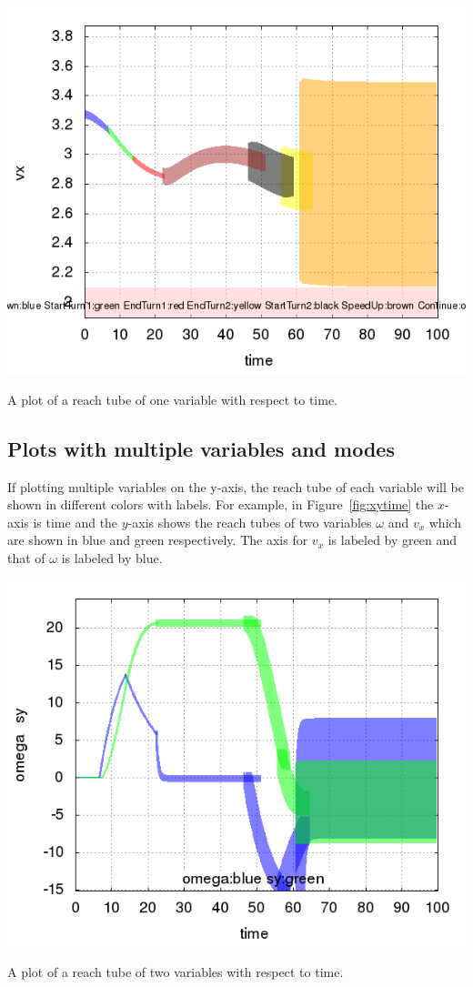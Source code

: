 \documentclass{tufte-book} %
\begin{document}
\begin{marginfigure}
 \centerline{\includegraphics[scale=.24,keepaspectratio=true]{Images/plot_open.png}}
 \caption{A plot of a reach tube of one variable with respect to time.} 
 \label{fig:reachtube_plot}
\end{marginfigure}

\subsection{Plots with multiple variables and modes}
\label{sec:multiplots}

If plotting multiple variables on the y-axis, the reach tube of each variable will be shown in different colors with labels. For example, in Figure~\ref{fig:xytime} the $x$-axis is time and the $y$-axis shows the reach tubes of two variables $\omega$ and $v_x$ which are shown in blue and green respectively. The axis for $v_x$ is labeled by green and that of $\omega$ is labeled by blue.

\begin{marginfigure}
 \centerline{\includegraphics[scale=.24,keepaspectratio=true]{Images/PLOT_RESULT_DOUBLE.png}}
 \caption{A plot of a reach tube of two variables with respect to time.} 
\label{fig:xytime}
\end{marginfigure}
\end{document}
